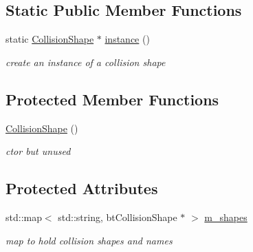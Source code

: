\subsection*{Static Public Member Functions}
\begin{DoxyCompactItemize}
\item 
\hypertarget{classCollisionShape_a419073488476916f9dba2dd97ae2bf76}{
static \hyperlink{classCollisionShape}{CollisionShape} $\ast$ \hyperlink{classCollisionShape_a419073488476916f9dba2dd97ae2bf76}{instance} ()}
\label{classCollisionShape_a419073488476916f9dba2dd97ae2bf76}

\begin{DoxyCompactList}\small\item\em create an instance of a collision shape \item\end{DoxyCompactList}\end{DoxyCompactItemize}
\subsection*{Protected Member Functions}
\begin{DoxyCompactItemize}
\item 
\hypertarget{classCollisionShape_a960ed2630ac29e6b28d773c97fab1d18}{
\hyperlink{classCollisionShape_a960ed2630ac29e6b28d773c97fab1d18}{CollisionShape} ()}
\label{classCollisionShape_a960ed2630ac29e6b28d773c97fab1d18}

\begin{DoxyCompactList}\small\item\em ctor but unused \item\end{DoxyCompactList}\end{DoxyCompactItemize}
\subsection*{Protected Attributes}
\begin{DoxyCompactItemize}
\item 
\hypertarget{classCollisionShape_a5f99d1b09559f4c26cf699bdfd042676}{
std::map$<$ std::string, btCollisionShape $\ast$ $>$ \hyperlink{classCollisionShape_a5f99d1b09559f4c26cf699bdfd042676}{m\_\-shapes}}
\label{classCollisionShape_a5f99d1b09559f4c26cf699bdfd042676}

\begin{DoxyCompactList}\small\item\em map to hold collision shapes and names \item\end{DoxyCompactList}\end{DoxyCompactItemize}
